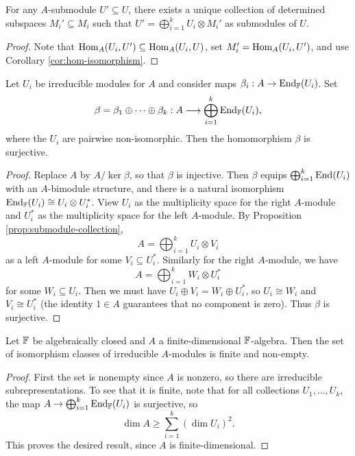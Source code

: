 \begin{prop}\label{prop:submodule-collection}
  For any $A$-submodule $U' \subseteq U$,
  there exists a unique collection of
  determined subspaces $M_i' \subseteq M_i$
  such that
  $U' = \bigoplus_{i = 1}^k U_i \otimes M_i'$
  as submodules of $U$.
\end{prop}

\begin{proof}
  Note that $\operatorname{Hom}_A(U_i, U') \subseteq \operatorname{Hom}_A(U_i, U)$,
  set $M_i' = \operatorname{Hom}_A(U_i, U')$,
  and use Corollary \ref{cor:hom-isomorphism}.
\end{proof}

\begin{theorem}
  Let $U_i$ be irreducible modules for
  $A$ and consider maps
  $\beta_i : A \to \operatorname{End}_{\mathbb{F}}(U_i)$. Set
  \[
    \beta = \beta_1 \oplus \cdots \oplus \beta_k : A \longrightarrow \bigoplus_{i = 1}^k \operatorname{End}_{\mathbb{F}}(U_i),
  \]
  where the $U_i$ are pairwise
  non-isomorphic. Then the
  homomorphism $\beta$ is surjective.
\end{theorem}

\begin{proof}
  Replace $A$ by $A /{\ker \beta}$, so that
  $\beta$ is injective. Then
  $\beta$ equips $\bigoplus_{i = 1}^k \operatorname{End}(U_i)$
  with an $A$-bimodule structure, and
  there is a natural isomorphism
  $\operatorname{End}_{\mathbb{F}}(U_i) \cong U_i \otimes U_i^*$.
  View $U_i$ as the multiplicity space
  for the right $A$-module and $U_i^*$ as
  the multiplicity space for the left
  $A$-module. By Proposition
  \ref{prop:submodule-collection},
  \[
    A = \bigoplus_{i = 1}^k U_i \otimes V_i
  \]
  as a left $A$-module for some
  $V_i \subseteq U_i^*$. Similarly for
  the right $A$-module, we have
  \[
    A = \bigoplus_{i = 1}^k W_i \otimes U_i^*
  \]
  for some $W_i \subseteq U_i$.
  Then we must have
  $U_i \oplus V_i = W_i \oplus U_i^*$,
  so $U_i \cong W_i$ and $V_i \cong U_i^*$
  (the identity $1 \in A$ guarantees that
  no component is zero). Thus
  $\beta$ is surjective.
\end{proof}

\begin{corollary}
  Let $\mathbb{F}$ be algebraically closed and
  $A$ a finite-dimensional $\mathbb{F}$-algebra.
  Then the set of isomorphism classes of
  irreducible $A$-modules is finite
  and non-empty.
\end{corollary}

\begin{proof}
  First the set is nonempty since $A$ is
  nonzero, so there are
  irreducible subrepresentations.
  To see that it is finite,
  note that for all collections
  $U_1, \dots, U_k$, the map
  $A \to \bigoplus_{i = 1}^k \operatorname{End}_{\mathbb{F}}(U_i)$
  is surjective, so
  \[
    \dim A \ge \sum_{i = 1}^k (\dim U_i)^2.
  \]
  This proves the desired result, since
  $A$ is finite-dimensional.
\end{proof}

